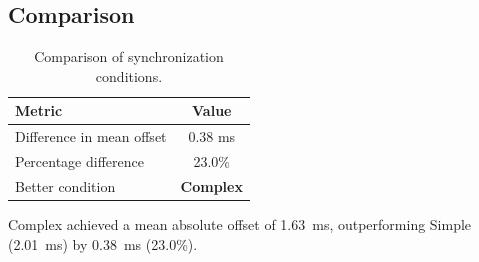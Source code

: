 \subsection*{Comparison}

\begin{table}[h!]
\centering
\begin{tabular}{|l|c|}
\hline
Metric & Value \\
\hline
Difference in mean offset & 0.38 ms \\
Percentage difference & 23.0\% \\
Better condition & \textbf{Complex} \\
\hline
\end{tabular}
\caption{Comparison of synchronization conditions.}
\label{tab:sync_comparison}
\end{table}

Complex achieved a mean absolute offset of 1.63~ms, outperforming Simple (2.01~ms) by 0.38~ms (23.0\%).
